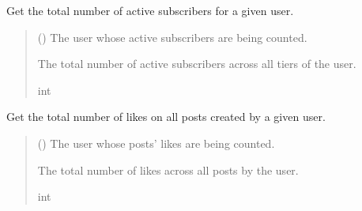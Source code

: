 \documentclass[letterpaper,10pt,english]{sphinxmanual}
\begin{document}
\begin{fulllineitems}
\label{\detokenize{modules/others:account.helpers.get_active_subscribers_count}}
\pysigstartsignatures
{}
\pysigstopsignatures
\sphinxAtStartPar
Get the total number of active subscribers for a given user.
\begin{quote}\begin{description}
\sphinxAtStartPar
{} ({\hyperref[\detokenize{modules/models:account.models.CustomUser}]{}}) \textendash{} The user whose active subscribers are being counted.

\sphinxAtStartPar
The total number of active subscribers across all tiers of the user.

\sphinxAtStartPar
int

\end{description}\end{quote}

\end{fulllineitems}


\begin{fulllineitems}
\label{\detokenize{modules/others:account.helpers.get_total_likes}}
\pysigstartsignatures
{}
\pysigstopsignatures
\sphinxAtStartPar
Get the total number of likes on all posts created by a given user.
\begin{quote}\begin{description}
\sphinxAtStartPar
{} ({\hyperref[\detokenize{modules/models:account.models.CustomUser}]{}}) \textendash{} The user whose posts’ likes are being counted.

\sphinxAtStartPar
The total number of likes across all posts by the user.

\sphinxAtStartPar
int

\end{description}\end{quote}

\end{fulllineitems}
\end{document}
